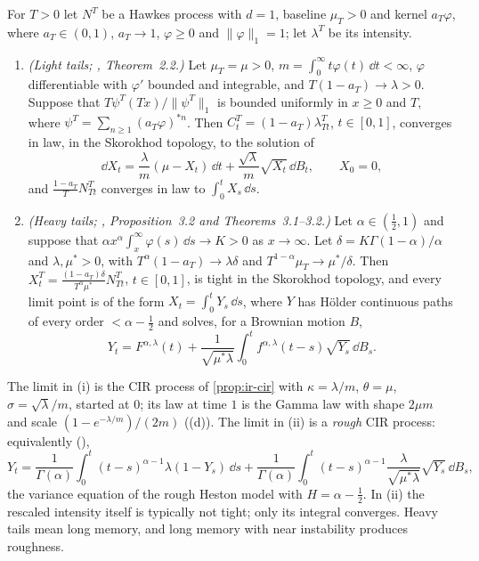 \begin{theorem}\label{thm:hk-scaling-limit}
For $T>0$ let $N^T$ be a Hawkes process with $d=1$, baseline $\mu_T>0$ and kernel $a_T\varphi$, where
$a_T\in(0,1)$, $a_T\to1$, $\varphi\ge0$ and $\|\varphi\|_1=1$; let $\lambda^T$ be its intensity.
\begin{enumerate}[label=(\roman*)]
  \item \emph{(Light tails; \textcite{jaisson-rosenbaum-2015}, Theorem~2.2.)} Let $\mu_T=\mu>0$,
    $m=\int_0^\infty t\varphi(t)\,\dd t<\infty$, $\varphi$ differentiable with $\varphi'$ bounded and integrable,
    and $T(1-a_T)\to\lambda>0$. Suppose that $T\psi^T(Tx)/\|\psi^T\|_1$ is bounded uniformly in $x\ge0$ and $T$,
    where $\psi^T=\sum_{n\ge1}(a_T\varphi)^{*n}$. Then $C^T_t=(1-a_T)\lambda^T_{Tt}$, $t\in[0,1]$, converges in law,
    in the Skorokhod topology, to the solution of
    \[
      \dd X_t=\frac\lambda m(\mu-X_t)\,\dd t+\frac{\sqrt\lambda}m\sqrt{X_t}\,\dd B_t,\qquad X_0=0,
    \]
    and $\frac{1-a_T}TN^T_{Tt}$ converges in law to $\int_0^tX_s\,\dd s$.
  \item \emph{(Heavy tails; \textcite{jaisson-rosenbaum-2016}, Proposition~3.2 and Theorems~3.1--3.2.)} Let
    $\alpha\in(\frac12,1)$ and suppose that $\alpha x^\alpha\int_x^\infty\varphi(s)\,\dd s\to K>0$ as $x\to\infty$.
    Let $\delta=K\Gamma(1-\alpha)/\alpha$ and $\lambda,\mu^*>0$, with $T^\alpha(1-a_T)\to\lambda\delta$ and
    $T^{1-\alpha}\mu_T\to\mu^*/\delta$. Then $X^T_t=\frac{(1-a_T)\delta}{T^\alpha\mu^*}N^T_{Tt}$, $t\in[0,1]$, is tight in
    the Skorokhod topology, and every limit point is of the form $X_t=\int_0^tY_s\,\dd s$, where $Y$ has
    H\"older continuous paths of every order $<\alpha-\frac12$ and solves, for a Brownian motion $B$,
    \begin{equation}\label{eq:hk-rough-cir}
      Y_t=F^{\alpha,\lambda}(t)+\frac1{\sqrt{\mu^*\lambda}}\int_0^tf^{\alpha,\lambda}(t-s)\sqrt{Y_s}\,\dd B_s .
    \end{equation}
\end{enumerate}
\end{theorem}

The limit in (i) is the CIR process of \cref{prop:ir-cir} with $\kappa=\lambda/m$, $\theta=\mu$, $\sigma=\sqrt\lambda/m$,
started at $0$; its law at time $1$ is the Gamma law with shape $2\mu m$ and scale $(1-e^{-\lambda/m})/(2m)$
((d)). The limit in (ii) is a \emph{rough} CIR
process: equivalently (),
\[
  Y_t=\frac1{\Gamma(\alpha)}\int_0^t(t-s)^{\alpha-1}\lambda(1-Y_s)\,\dd s
  +\frac1{\Gamma(\alpha)}\int_0^t(t-s)^{\alpha-1}\frac{\lambda}{\sqrt{\mu^*\lambda}}\sqrt{Y_s}\,\dd B_s ,
\]
the variance equation of the rough Heston model with $H=\alpha-\frac12$. In (ii) the rescaled intensity itself is
typically not tight; only its integral converges. Heavy tails mean long memory, and long memory with near
instability produces roughness.

